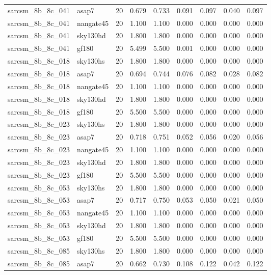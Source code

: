 \begin{tabular}{llrrrrrrr}
sarcsm\_8b\_8c\_041 & asap7 & 20 & 0.679 & 0.733 & 0.091 & 0.097 & 0.040 & 0.097 \\
sarcsm\_8b\_8c\_041 & nangate45 & 20 & 1.100 & 1.100 & 0.000 & 0.000 & 0.000 & 0.000 \\
sarcsm\_8b\_8c\_041 & sky130hd & 20 & 1.800 & 1.800 & 0.000 & 0.000 & 0.000 & 0.000 \\
sarcsm\_8b\_8c\_041 & gf180 & 20 & 5.499 & 5.500 & 0.001 & 0.000 & 0.000 & 0.000 \\
sarcsm\_8b\_8c\_018 & sky130hs & 20 & 1.800 & 1.800 & 0.000 & 0.000 & 0.000 & 0.000 \\
sarcsm\_8b\_8c\_018 & asap7 & 20 & 0.694 & 0.744 & 0.076 & 0.082 & 0.028 & 0.082 \\
sarcsm\_8b\_8c\_018 & nangate45 & 20 & 1.100 & 1.100 & 0.000 & 0.000 & 0.000 & 0.000 \\
sarcsm\_8b\_8c\_018 & sky130hd & 20 & 1.800 & 1.800 & 0.000 & 0.000 & 0.000 & 0.000 \\
sarcsm\_8b\_8c\_018 & gf180 & 20 & 5.500 & 5.500 & 0.000 & 0.000 & 0.000 & 0.000 \\
sarcsm\_8b\_8c\_023 & sky130hs & 20 & 1.800 & 1.800 & 0.000 & 0.000 & 0.000 & 0.000 \\
sarcsm\_8b\_8c\_023 & asap7 & 20 & 0.718 & 0.751 & 0.052 & 0.056 & 0.020 & 0.056 \\
sarcsm\_8b\_8c\_023 & nangate45 & 20 & 1.100 & 1.100 & 0.000 & 0.000 & 0.000 & 0.000 \\
sarcsm\_8b\_8c\_023 & sky130hd & 20 & 1.800 & 1.800 & 0.000 & 0.000 & 0.000 & 0.000 \\
sarcsm\_8b\_8c\_023 & gf180 & 20 & 5.500 & 5.500 & 0.000 & 0.000 & 0.000 & 0.000 \\
sarcsm\_8b\_8c\_053 & sky130hs & 20 & 1.800 & 1.800 & 0.000 & 0.000 & 0.000 & 0.000 \\
sarcsm\_8b\_8c\_053 & asap7 & 20 & 0.717 & 0.750 & 0.053 & 0.050 & 0.021 & 0.050 \\
sarcsm\_8b\_8c\_053 & nangate45 & 20 & 1.100 & 1.100 & 0.000 & 0.000 & 0.000 & 0.000 \\
sarcsm\_8b\_8c\_053 & sky130hd & 20 & 1.800 & 1.800 & 0.000 & 0.000 & 0.000 & 0.000 \\
sarcsm\_8b\_8c\_053 & gf180 & 20 & 5.500 & 5.500 & 0.000 & 0.000 & 0.000 & 0.000 \\
sarcsm\_8b\_8c\_085 & sky130hs & 20 & 1.800 & 1.800 & 0.000 & 0.000 & 0.000 & 0.000 \\
sarcsm\_8b\_8c\_085 & asap7 & 20 & 0.662 & 0.730 & 0.108 & 0.122 & 0.042 & 0.122 \\

\end{tabular}
